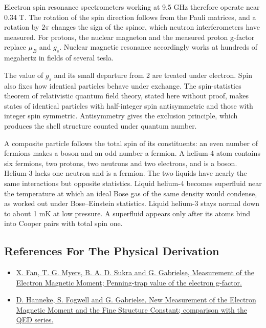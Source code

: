 \documentclass[11pt,oneside]{book}
\begin{document}
Electron spin resonance spectrometers working at 9.5 GHz therefore operate near 0.34 T. The rotation of the spin direction follows from the Pauli matrices, and a rotation by \(2\pi\) changes the sign of the spinor, which neutron interferometers have measured. For protons, the nuclear magneton and the measured proton g-factor replace \(\mu_B\) and \(g_s\). Nuclear magnetic resonance accordingly works at hundreds of megahertz in fields of several tesla.

The value of \(g_s\) and its small departure from 2 are treated under electron. Spin also fixes how identical particles behave under exchange. The spin-statistics theorem of relativistic quantum field theory, stated here without proof, makes states of identical particles with half-integer spin antisymmetric and those with integer spin symmetric. Antisymmetry gives the exclusion principle, which produces the shell structure counted under quantum number.

A composite particle follows the total spin of its constituents: an even number of fermions makes a boson and an odd number a fermion. A helium-4 atom contains six fermions, two protons, two neutrons and two electrons, and is a boson. Helium-3 lacks one neutron and is a fermion. The two liquids have nearly the same interactions but opposite statistics. Liquid helium-4 becomes superfluid near the temperature at which an ideal Bose gas of the same density would condense, as worked out under Bose--Einstein statistics. Liquid helium-3 stays normal down to about 1 mK at low pressure. A superfluid appears only after its atoms bind into Cooper pairs with total spin one.

\subsection*{References For The Physical Derivation}
\begin{itemize}
\item \href{https://arxiv.org/abs/2209.13084}{X. Fan, T. G. Myers, B. A. D. Sukra and G. Gabrielse, Measurement of the Electron Magnetic Moment; Penning-trap value of the electron g-factor.}
\item \href{https://arxiv.org/abs/0801.1134}{D. Hanneke, S. Fogwell and G. Gabrielse, New Measurement of the Electron Magnetic Moment and the Fine Structure Constant; comparison with the QED series.}
\end{itemize}
\end{document}
